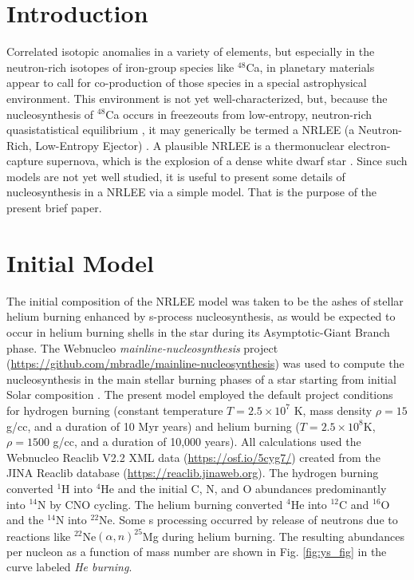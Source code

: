 \documentclass[preprint]{revtex4-2}
\begin{document}
\maketitle

\section{Introduction}\label{sec:intro}

Correlated isotopic anomalies in a variety of elements, but especially
in the neutron-rich isotopes of iron-group species like $^{48}$Ca, in planetary
materials appear to call for co-production of those species in a special
astrophysical environment.  This environment is not yet well-characterized,
but, 
because the nucleosynthesis of $^{48}$Ca
occurs in freezeouts from low-entropy, neutron-rich quasistatistical equilibrium
\cite{1996ApJ...462..825M}, it may generically be termed a NRLEE
(a Neutron-Rich, Low-Entropy Ejector) \cite{Bermingham2021}.  A plausible
NRLEE is a thermonuclear electron-capture supernova, which is the explosion
of a dense white dwarf star \cite{2019A&A...622A..74J}.  Since such models
are not yet well studied, it is useful to present some details of
nucleosynthesis in a NRLEE via a simple model.  That is the purpose of the
present brief paper.

\section{Initial Model} \label{sec:initial}

The initial composition of the NRLEE model was taken to be the ashes of
stellar helium burning enhanced by s-process nucleosynthesis, as would be
expected to occur in helium burning shells in the star during its
Asymptotic-Giant Branch phase.  The Webnucleo {\it mainline-nucleosynthesis}
project (\url{https://github.com/mbradle/mainline-nucleosynthesis}) was
used to compute the nucleosynthesis in the main stellar burning phases of
a star starting from initial Solar composition \cite{2003ApJ...591.1220L}.
The present model employed the default project conditions for hydrogen burning
(constant temperature $T = 2.5\times 10^7$ K, mass density $\rho = 15$ g/cc,
and a duration of 10 Myr years) and helium burning
($T = 2.5\times 10^8$K, $\rho = 1500$ g/cc, and a duration of 10,000 years).
All calculations used the Webnucleo Reaclib V2.2 XML data
(\url{https://osf.io/5cyg7/}) created from the JINA Reaclib database
(\url{https://reaclib.jinaweb.org}).
The hydrogen burning converted $^1$H into $^4$He and the initial C, N, and O
abundances predominantly into $^{14}$N by CNO cycling.  The helium burning
converted $^4$He into $^{12}$C and $^{16}$O and the $^{14}$N into $^{22}$Ne.
Some s processing occurred by release of neutrons due to reactions like
$^{22}$Ne$(\alpha,n)^{25}$Mg during helium burning.  The resulting abundances
per nucleon as a function of mass number are shown in
Fig. \ref{fig:ys_fig} in the curve labeled {\it He burning}.
\end{document}

